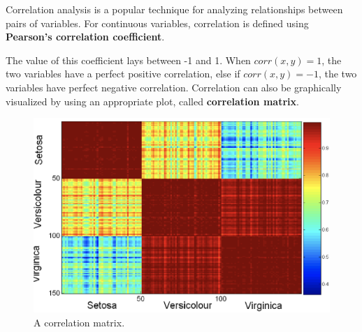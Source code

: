 Correlation analysis is a popular technique for analyzing relationships between pairs of variables. For continuous variables, correlation is defined using \textbf{Pearson's correlation coefficient}.


The value of this coefficient lays between -1 and 1. When $corr(x,y) = 1$, the two variables have a perfect positive correlation, else if $corr(x,y) = -1$, the two variables have perfect negative correlation. Correlation can also be graphically visualized by using an appropriate plot, called \textbf{correlation matrix}.

\begin{figure}[h]
    \centering
    \includegraphics[width=0.4\linewidth]{img/correlation matrix.png}
    \caption{A correlation matrix.}
\end{figure}
